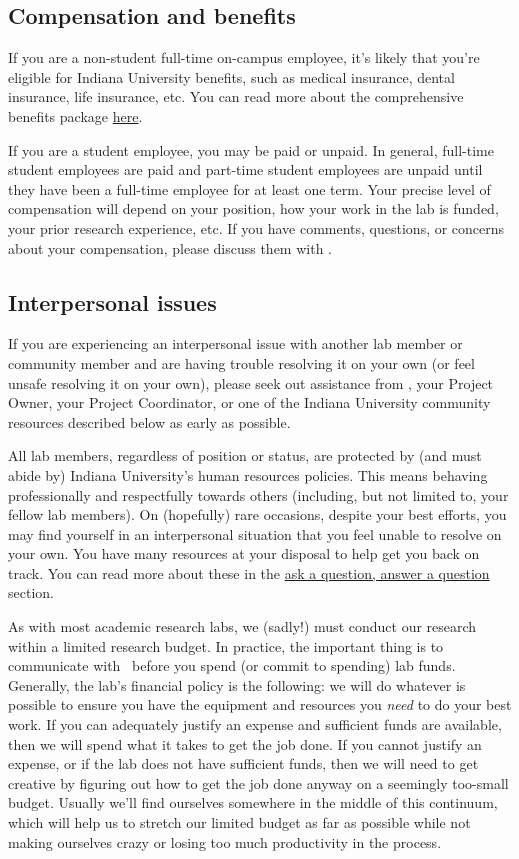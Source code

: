 \documentclass{tufte-book} %
\begin{document}
\subsection{Compensation and benefits}
If you are a non-student full-time on-campus employee, it's likely that you're eligible for Indiana University benefits, such as medical insurance, dental insurance, life insurance, etc. You can read more about the comprehensive benefits package \href{http://hr.iu.edu/enroll/index.html}{here}.

If you are a student employee, you may be paid or unpaid. In general, full-time student employees are paid and part-time student employees are unpaid until they have been a full-time employee for at least one term. Your precise level of compensation will depend on your position, how your work in the lab is funded, your prior research
experience, etc. If you have comments, questions, or concerns about your compensation, please discuss them with \director.

\subsection{Interpersonal issues}
If you are experiencing an interpersonal issue with another lab member or community member and are having trouble resolving it on your own (or feel unsafe resolving it on your own), please seek out assistance from \director, your Project Owner, your Project Coordinator, or one of the Indiana University community resources described below as early as possible.

All lab members, regardless of position or status, are protected by (and must abide by) Indiana University's human resources policies. This means behaving professionally and respectfully towards others (including, but not limited to, your fellow lab members). On (hopefully) rare occasions, despite your best efforts, you may find yourself in an interpersonal situation that you feel unable to resolve on your own. You have many resources at your disposal to help get you back on track. You can read more about these in the \hyperref[ch:faq]{ask a question, answer a question} section.



\noindent As with most academic research labs, we (sadly!) must conduct our research within a limited research budget. In practice, the  important thing is to communicate with \director~before you spend (or  commit to spending) lab funds. Generally, the lab's financial policy is the following: we will do whatever is possible to ensure you have the equipment and resources you \textit{need} to do your best work. If you can adequately justify an expense and sufficient funds are available, then we will spend what it takes to get the job done. If you cannot justify an expense, or if the lab does not have sufficient funds, then we will need to get creative by figuring out how to get the job done anyway on a seemingly too-small budget. Usually we'll find ourselves somewhere in the middle of this continuum, which will help us to stretch our limited budget as far as possible while not making ourselves crazy or losing too much productivity in the process.
\end{document}
